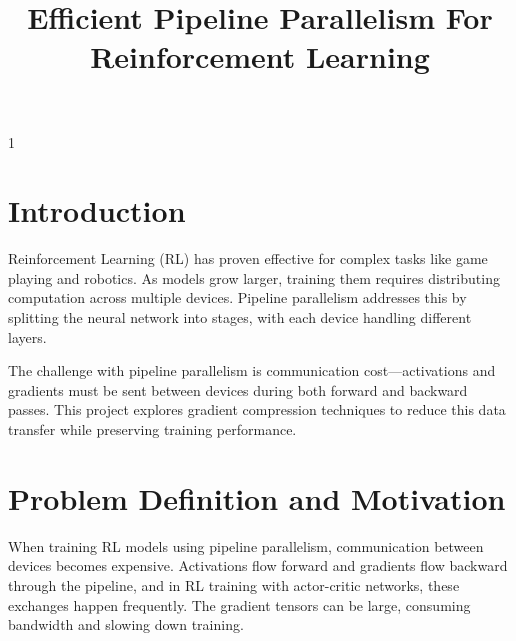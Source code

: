 \documentclass[11pt,onecolumn]{sjsucs-proposal}
\def\exampleflag{0}
\begin{document}
\if\exampleflag1
  
\else

\title{Efficient Pipeline Parallelism For Reinforcement Learning}

\def\myname{Faiz Sameer Ahmed}

\def\adv{Genya Ishigaki}
\def\advemail{genya.ishigaki@sjsu.edu}

\def\comone{Fabio Di Troia}
\def\comoneemail{fabio.ditroia@sjsu.edu}

\def\comtwo{Jelena Gligorijevic}
\def\comtwoemail{jelena.gligorijevic@sjsu.edu}
\def\comtwoaffil{}

\def\semester{Spring}
\def\year{2026}


\def\keywords{Reinforcement Learning, Pipeline Parallelism, Gradient Compression, Distributed Training}


\maketitle %


\section{Introduction}
Reinforcement Learning (RL) has proven effective for complex tasks like game playing and robotics. As models grow larger, training them requires distributing computation across multiple devices. Pipeline parallelism addresses this by splitting the neural network into stages, with each device handling different layers.

The challenge with pipeline parallelism is communication cost—activations and gradients must be sent between devices during both forward and backward passes. This project explores gradient compression techniques to reduce this data transfer while preserving training performance.

\makekeywords %

\section{Problem Definition and Motivation}
When training RL models using pipeline parallelism, communication between devices becomes expensive. Activations flow forward and gradients flow backward through the pipeline, and in RL training with actor-critic networks, these exchanges happen frequently. The gradient tensors can be large, consuming bandwidth and slowing down training.
\end{document}
